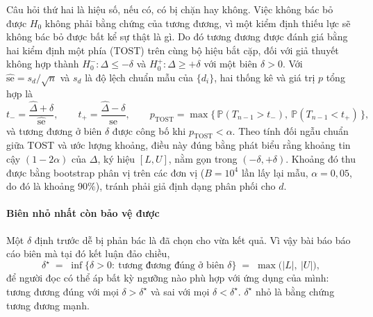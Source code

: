 \documentclass[preprint,12pt]{elsarticle}
\begin{document}
Câu hỏi thứ hai là hiệu số, nếu có, có bị chặn hay không. Việc không bác bỏ được $H_0$ không phải bằng chứng của
tương đương, vì một kiểm định thiếu lực sẽ không bác bỏ được bất kể sự thật là gì. Do đó tương đương được đánh giá
bằng hai kiểm định một phía (TOST) trên cùng bộ hiệu bắt cặp, đối với giả thuyết không hợp thành
$H_0^{-}: \Delta \le -\delta$ và $H_0^{+}: \Delta \ge +\delta$ với một biên $\delta > 0$. Với
$\widehat{\mathrm{se}} = s_d/\sqrt{n}$ và $s_d$ là độ lệch chuẩn mẫu của $\{d_i\}$, hai thống kê và giá trị $p$
tổng hợp là
\begin{equation}
t_{-} = \frac{\hat{\Delta}+\delta}{\widehat{\mathrm{se}}}, \qquad
t_{+} = \frac{\hat{\Delta}-\delta}{\widehat{\mathrm{se}}}, \qquad
p_{\text{TOST}} = \max\!\big\{\,\mathbb{P}(T_{n-1} > t_{-}),\ \mathbb{P}(T_{n-1} < t_{+})\,\big\},
\end{equation}
và tương đương ở biên $\delta$ được công bố khi $p_{\text{TOST}} < \alpha$. Theo tính đối ngẫu chuẩn giữa TOST và
ước lượng khoảng, điều này đúng bằng phát biểu rằng khoảng tin cậy $(1-2\alpha)$ của $\Delta$, ký hiệu $[L, U]$,
nằm gọn trong $(-\delta, +\delta)$. Khoảng đó thu được bằng bootstrap phân vị trên các đơn vị ($B = 10^{4}$ lần
lấy lại mẫu, $\alpha = 0{,}05$, do đó là khoảng $90\%$), tránh phải giả định dạng phân phối cho $d$.

\paragraph{Biên nhỏ nhất còn bảo vệ được} Một $\delta$ định trước dễ bị phản bác là đã chọn cho vừa kết quả. Vì
vậy bài báo báo cáo biên mà tại đó kết luận đảo chiều,
\begin{equation}\label{eq:dstar}
\delta^\star \;=\; \inf\{\delta > 0:\ \text{tương đương đúng ở biên } \delta\} \;=\; \max\big(|L|,\ |U|\big),
\end{equation}
để người đọc có thể áp bất kỳ ngưỡng nào phù hợp với ứng dụng của mình: tương đương đúng với mọi
$\delta > \delta^\star$ và sai với mọi $\delta < \delta^\star$. $\delta^\star$ nhỏ là bằng chứng tương đương mạnh.
\end{document}
